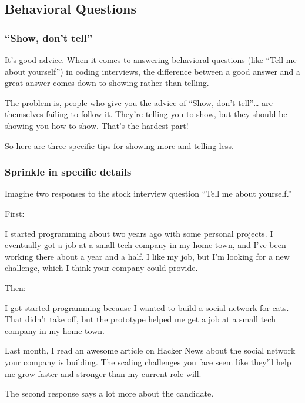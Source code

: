 \documentclass{article}
\begin{document}
\subsection{Behavioral Questions}

\subsubsection{“Show, don’t tell”}

It’s good advice. When it comes to answering behavioral questions (like “Tell me about yourself”) in coding interviews, the difference between a good answer and a great answer comes down to showing rather than telling.


The problem is, people who give you the advice of “Show, don’t tell”… are themselves failing to follow it. They’re telling you to show, but they should be showing you how to show. That’s the hardest part!

So here are three specific tips for showing more and telling less.


\subsubsection{Sprinkle in specific details}

Imagine two responses to the stock interview question “Tell me about yourself.”

First:
\begin{tcolorbox}
I started programming about two years ago with some personal projects. I eventually got a job at a small tech company in my home town, and I’ve been working there about a year and a half. I like my job, but I’m looking for a new challenge, which I think your company could provide.  
\end{tcolorbox}


Then:
\begin{tcolorbox}
I got started programming because I wanted to build a social network for cats. That didn’t take off, but the prototype helped me get a job at a small tech company in my home town.

Last month, I read an awesome article on Hacker News about the social network your company is building. The scaling challenges you face seem like they’ll help me grow faster and stronger than my current role will.
\end{tcolorbox}



The second response says a lot more about the candidate.
\end{document}
